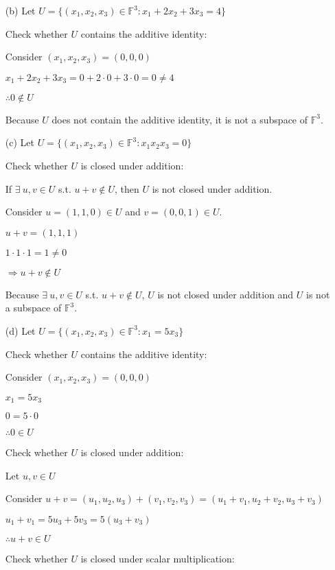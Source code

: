 \documentclass{article}
\begin{document}
\begin{enumerate}[nolistsep]
\begin{enumerate}[nolistsep]
			\item[(b)] Let $U = {\{(x_1, x_2, x_3) \in \mathbb{F}^3 : x_1 + 2x_2 + 3x_3 = 4 \}}$
			
			Check whether $U$ contains the additive identity:
			
			Consider $(x_1, x_2, x_3) = (0, 0, 0)$
			
			$x_1 + 2x_2 + 3x_3 = 0 + 2 \cdot 0 + 3 \cdot 0 = 0 \neq 4$
			
			$\therefore 0 \notin U$
			
			Because $U$ does not contain the additive identity, it is not a subspace of $\mathbb{F}^3$.

			\item[(c)] Let $U = {\{(x_1, x_2, x_3) \in \mathbb{F}^3 : x_1x_2x_3 = 0 \}}$
			
			Check whether $U$ is closed under addition:
			
			If $\exists\ u,v \in U$ s.t. $u + v \notin U$, then $U$ is not closed under addition.
			
			Consider $u = (1, 1, 0) \in U$ and $v = (0, 0, 1) \in U$.
			
			$u + v = (1, 1, 1)$
			
			$1 \cdot 1 \cdot 1 = 1 \neq 0$
			
			$\Rightarrow u + v \notin U$
			
			Because $\exists\ u,v \in U$ s.t. $u + v \notin U$, $U$ is not closed under addition and  $U$ is not a subspace of $\mathbb{F}^3$.
			
			\item[(d)] Let $U = {\{(x_1, x_2, x_3) \in \mathbb{F}^3 : x_1 = 5x_3 \}}$
			
			Check whether $U$ contains the additive identity:
			
			Consider $(x_1, x_2, x_3) = (0, 0, 0)$
			
			$x_1 = 5x_3$
			
			$0 = 5 \cdot 0$
			
			$\therefore 0 \in U$
			
			Check whether $U$ is closed under addition:
			
			Let $u, v \in U$
			
			Consider $u + v = (u_1, u_2, u_3) + (v_1, v_2, v_3) = (u_1 + v_1, u_2 + v_2, u_3 + v_3)$
			
			$u_1 + v_1 = 5u_3 + 5v_3 = 5(u_3 + v_3)$
			
			$\therefore u + v \in U$
			
			Check whether $U$ is closed under scalar multiplication:
			

\end{enumerate}
\end{enumerate}
\end{document}
